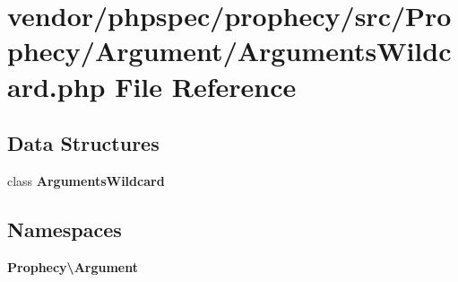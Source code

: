 \section{vendor/phpspec/prophecy/src/\+Prophecy/\+Argument/\+Arguments\+Wildcard.php File Reference}
\label{_arguments_wildcard_8php}
\subsection*{Data Structures}
\begin{DoxyCompactItemize}
\item 
class {\bf Arguments\+Wildcard}
\end{DoxyCompactItemize}
\subsection*{Namespaces}
\begin{DoxyCompactItemize}
\item 
 {\bf Prophecy\textbackslash{}\+Argument}
\end{DoxyCompactItemize}
